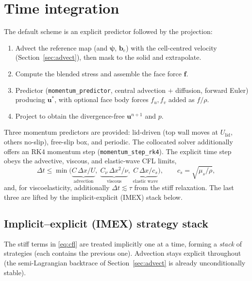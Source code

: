 \documentclass[11pt]{article}
\newcommand{\uv}{\bm{u}}
\newcommand{\bten}{\bm{b}}
\begin{document}
\section{Time integration}
The default scheme is an explicit predictor followed by the projection:
\begin{enumerate}[nosep]
  \item Advect the reference map (and $\bm\psi$, $\bten_e$) with the cell-centred
  velocity (Section~\ref{sec:advect}), then mask to the solid and extrapolate.
  \item Compute the blended stress and assemble the face force $\bm f$.
  \item Predictor (\texttt{momentum\_predictor}, central advection $+$ diffusion,
  forward Euler) producing $\uv^{*}$, with optional face body forces $f_u,f_v$ added
  as $f/\rho$.
  \item Project to obtain the divergence-free $\uv^{n+1}$ and $p$.
\end{enumerate}
Three momentum predictors are provided: lid-driven (top wall moves at $U_{\text{lid}}$,
others no-slip), free-slip box, and periodic. The collocated solver additionally
offers an RK4 momentum step (\texttt{momentum\_step\_rk4}).
The explicit time step obeys the advective, viscous, and elastic-wave CFL limits,
\begin{equation}
\Delta t \le \min\!\bigl(\underbrace{C\,\Delta x/U}_{\text{advection}},\;
\underbrace{C_\nu\,\Delta x^2/\nu}_{\text{viscous}},\;
\underbrace{C\,\Delta x/c_s}_{\text{elastic wave}}\bigr),
\qquad c_s=\sqrt{\mu_s/\rho},
\label{eq:cfl}
\end{equation}
and, for viscoelasticity, additionally $\Delta t\lesssim\tau$ from the stiff
relaxation. The last three are lifted by the implicit-explicit (IMEX) stack below.

\subsection{Implicit--explicit (IMEX) strategy stack}
\label{sec:imex}
The stiff terms in \eqref{eq:cfl} are treated implicitly one at a time, forming a
\emph{stack} of strategies (each contains the previous one). Advection stays explicit
throughout (the semi-Lagrangian backtrace of Section~\ref{sec:advect} is already
unconditionally stable).
\end{document}
